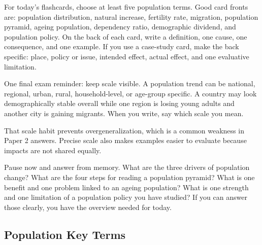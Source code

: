 \documentclass[11pt,a4paper]{article}
\begin{document}
For today's flashcards, choose at least five population terms. Good card fronts
are: population distribution, natural increase, fertility rate, migration,
population pyramid, ageing population, dependency ratio, demographic dividend,
and population policy. On the back of each card, write a definition, one cause,
one consequence, and one example. If you use a case-study card, make the back
specific: place, policy or issue, intended effect, actual effect, and one
evaluative limitation.

One final exam reminder: keep scale visible. A population trend can be national,
regional, urban, rural, household-level, or age-group specific. A country may
look demographically stable overall while one region is losing young adults and
another city is gaining migrants. When you write, say which scale you mean.

That scale habit prevents overgeneralization, which is a common weakness in
Paper 2 answers. Precise scale also makes examples easier to evaluate because
impacts are not shared equally.

Pause now and answer from memory. What are the three drivers of population
change? What are the four steps for reading a population pyramid? What is one
benefit and one problem linked to an ageing population? What is one strength and
one limitation of a population policy you have studied? If you can answer those
clearly, you have the overview needed for today.

\subsection{Population Key Terms}
\end{document}
